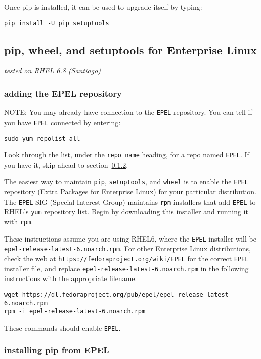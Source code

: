 Once pip is installed, it can be used to upgrade itself by typing:
\begin{lstlisting}
pip install -U pip setuptools
\end{lstlisting}

\subsection{pip, wheel, and setuptools for Enterprise Linux}
\label{subsec:setup_rhel}

\textit{tested on RHEL 6.8 (Santiago)}

\subsubsection{adding the EPEL repository}

NOTE: You may already have connection to the \verb|EPEL| repository.
You can tell if you have \verb|EPEL| connected by entering:
\begin{lstlisting}
sudo yum repolist all
\end{lstlisting}
Look through the list, 
under the \verb|repo name| heading,
for a repo named \verb|EPEL|.
If you have it, skip ahead to section~\ref{subsubsec:pip_from_epel}.

The easiest way to maintain \verb|pip|, \verb|setuptools|, and \verb|wheel|
is to enable the \verb|EPEL| repository (Extra Packages for Enterprise Linux)
for your particular distribution.
The \verb|EPEL| SIG (Special Interest Group) 
maintains \verb|rpm| installers that add \verb|EPEL| 
to RHEL's \verb|yum| repository list.
Begin by downloading this installer
and running it with \verb|rpm|.

These instructions assume you are using RHEL6,
where the \verb|EPEL| installer will be 
\verb|epel-release-latest-6.noarch.rpm|.
For other Enterprise Linux distributions,
check the web at \verb|https://fedoraproject.org/wiki/EPEL|
for the correct \verb|EPEL| installer file,
and replace \verb|epel-release-latest-6.noarch.rpm|
in the following instructions with the appropriate filename.
\begin{lstlisting}
wget https://dl.fedoraproject.org/pub/epel/epel-release-latest-6.noarch.rpm
rpm -i epel-release-latest-6.noarch.rpm  
\end{lstlisting}
These commands should enable \verb|EPEL|.


\subsubsection{installing pip from EPEL}
\label{subsubsec:pip_from_epel}

